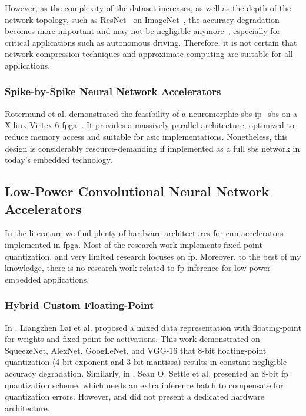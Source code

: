 However, as the complexity of the dataset increases, as well as the depth of the network topology, such as ResNet~\cite{he2016deep} on ImageNet~\cite{russakovsky2015imagenet}, the accuracy degradation becomes more important and may not be negligible anymore~\cite{rastegari2016xnor}, especially for critical applications such as autonomous driving. Therefore, it is not certain that network compression techniques and approximate computing are suitable for all applications.

\subsubsection{Spike-by-Spike Neural Network Accelerators}
Rotermund et al. demonstrated the feasibility of a neuromorphic \gls{sbs} \gls{ip_sbs} on a Xilinx Virtex 6 \gls{fpga}~\cite{rotermund2018massively}. It provides a massively parallel architecture, optimized to reduce memory access and suitable for \gls{asic} implementations. Nonetheless, this design is considerably resource-demanding if implemented as a full \gls{sbs} network in today's embedded technology.

\subsection{Low-Power Convolutional Neural Network Accelerators}
\label{sec:related_work}
In the literature we find plenty of hardware architectures for \gls{cnn} accelerators implemented in \gls{fpga}. Most of the research work implements fixed-point quantization, and very limited research focuses on \gls{fp}. Moreover, to the best of my knowledge, there is no research work related to \gls{fp} inference for low-power embedded applications.


\subsubsection{Hybrid Custom Floating-Point}
In \cite{lai2017deep}, Liangzhen Lai et al. proposed a mixed data representation with floating-point for weights and fixed-point for activations. This work demonstrated on SqueezeNet, AlexNet, GoogLeNet, and VGG-16 that 8-bit floating-point quantization (4-bit exponent and 3-bit mantissa) results in constant negligible accuracy degradation. Similarly, in \cite{settle2018quantizing}, Sean O. Settle et al. presented an 8-bit \gls{fp} quantization scheme, which needs an extra inference batch to compensate for quantization errors. However, \cite{lai2017deep} and \cite{settle2018quantizing} did not present a dedicated hardware architecture.

